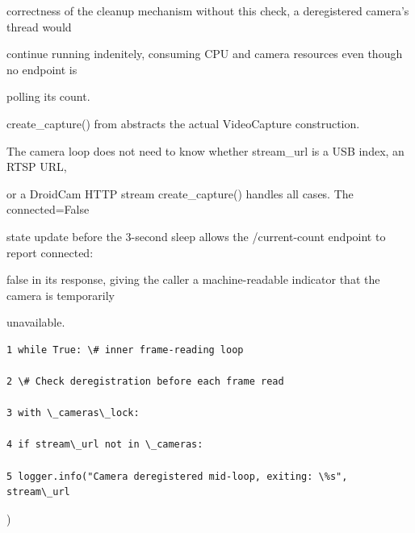 correctness of the cleanup mechanism  without this check, a deregistered camera's thread would

continue running indenitely, consuming CPU and camera resources even though no endpoint is

polling its count.

create\_capture() from abstracts the actual VideoCapture construction.

The camera loop does not need to know whether stream\_url is a USB index, an RTSP URL,

or a DroidCam HTTP stream  create\_capture() handles all cases. The connected=False

state update before the 3-second sleep allows the /current-count endpoint to report connected:

false in its response, giving the caller a machine-readable indicator that the camera is temporarily

unavailable.

\begin{listingbox}
	\begin{verbatim}
1 while True: \# inner frame-reading loop

2 \# Check deregistration before each frame read

3 with \_cameras\_lock:

4 if stream\_url not in \_cameras:

5 logger.info("Camera deregistered mid-loop, exiting: \%s", stream\_url

\end{verbatim}
\end{listingbox}
)

